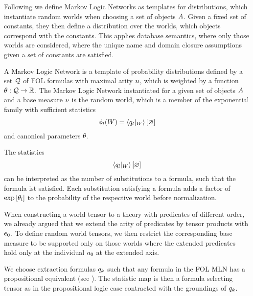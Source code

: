 Following \cite{richardson_markov_2006} we define Markov Logic Networks as templates for distributions, which instantiate random worlds when choosing a set of objects $A$.
Given a fixed set of constants, they then define a distribution over the worlds, which objects correspond with the constants. %
This applies database semantics, where only those worlds are considered, where the unique name and domain closure assumptions given a set of constants are satisfied.


\begin{definition}
	A Markov Logic Network is a template of probability distributions defined by a set $\mathcal{Q}$ of FOL formulas with maximal arity $n$, which is weighted by a function $\theta:\mathcal{Q} \rightarrow \mathbb{R}$.
	The Markov Logic Network instantiated for a given set of objects $A$ and a base measure $\nu$ is the random world, which is a member of the exponential family with sufficient statistics
	\begin{align*}
		\sstat_{\statenumerator}(\dataworld)  = \sbcontraction{\groundingof{\folexformula_\statenumerator}} %
	\end{align*}
	and canonical parameters $\theta$.
\end{definition}

The statistics
	\begin{align*}
		\sbcontraction{\groundingof{\folexformula_\statenumerator}} %
	\end{align*}
can be interpreted as the number of substitutions to a formula, such that the formula ist satisfied.
Each substitution satisfying a formula adds a factor of $\mathrm{exp}\left[\theta_l\right]$ to the probability of the respective world before normalization.


%
When constructing a world tensor to a theory with predicates of different order, we already argued that we extend the arity of predicates by tensor products with $e_{0}$.
To define random world tensors, we then restrict the corresponding base measure to be supported only on those worlds where the extended predicates hold only at the individual $a_{0}$ at the extended axis.



We choose extraction formulas $q_{k}$ such that any formula in the FOL MLN has a propositional equivalent (see ).
The statistic map is then a formula selecting tensor as in the propositional logic case contracted with the groundings of $q_{k}$.




